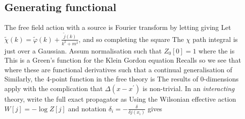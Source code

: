 \documentclass{article}
\begin{document}
\subsection{Generating functional}
The free field action with a source is 
Fourier transform by letting 
giving 
Let $\tilde{\chi}(k) = \tilde{\varphi}(k) + \frac{\tilde{j}(k)}{k^2+m^2}$, and so completing the square
\eq{
S_0[\tilde{\varphi},\tilde{j}]] = \frac{1}{2} \int \fmeas \left[ \tilde{\chi}(-k)(k^2+m^2)\tilde{\chi}(k) + \frac{\tilde{j}(-k)\tilde{j}(k)}{k^2+m^2} \right]
}
The $\chi$ path integral is just over a Gaussian. Assum normalisation such that $Z_0[0]=1$ 
where the  is 
This is a Green's function for the Klein Gordon equation
Recalls 
so we see that 
where these are functional derivatives such that 
a continual generalisation of 
Similarly, the 4-point function in the free theory is 
The results of 0-dimensions apply with the complication that $\Delta(x-x^\prime)$ is non-trivial. 
In an \emph{interacting} theory, write the full exact propagator as 
Using the Wilsonian effective action $W[j] = -\log Z[j]$ and notation $\delta_i = - \frac{\delta}{\delta j(x_i)}$ gives 
\end{document}
